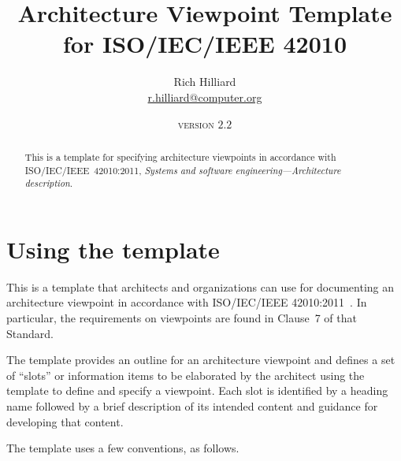 \documentclass[10pt]{article}
\begin{document}
\title{Architecture Viewpoint Template for ISO/IEC/IEEE 42010}

\author{Rich Hilliard \\
  \href{mailto:r.hilliard@computer.org}{r.hilliard@computer.org}}

\date{\textsc{version} $2.2$}

\maketitle



\begin{abstract}
  \noindent This is a template for specifying architecture viewpoints in
  accordance with ISO/IEC/IEEE~42010:2011, \textit{Systems and
    software engineering---Architecture description}.
\end{abstract}



\section*{Using the template}

This is a template that architects and organizations can use for
documenting an architecture viewpoint in accordance with
ISO/IEC/IEEE 42010:2011~\cite{ISO42010:2011}. In particular, the
requirements on viewpoints are found in Clause~7 of that Standard.

The template provides an outline for an architecture viewpoint and
defines a set of ``slots'' or information items to be elaborated by
the architect using the template to define and specify a viewpoint.
Each slot is identified by a heading name followed by a brief
description of its intended content and guidance for developing that
content. 

The template uses a few conventions, as follows.


\end{document}
